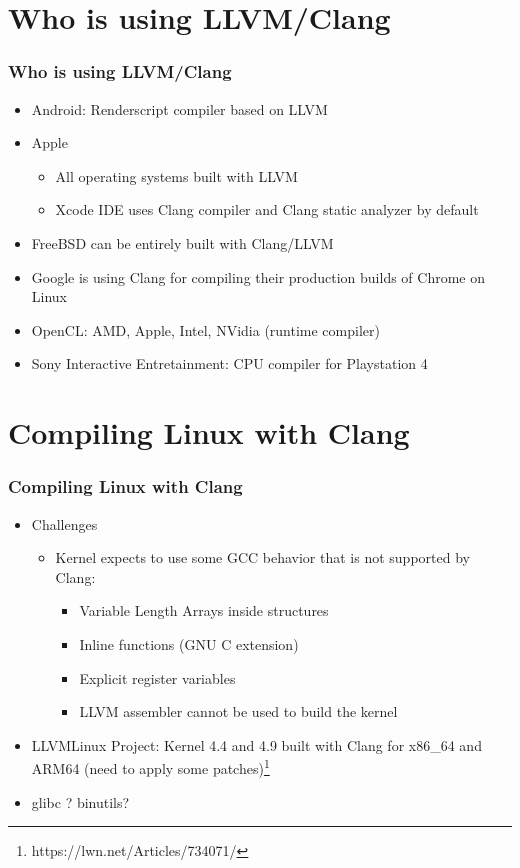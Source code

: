 \documentclass{beamer}
\begin{document}
\section{Who is using LLVM/Clang}

\begin{frame}
\frametitle{Who is using LLVM/Clang}
\begin{itemize}
  \item Android: Renderscript compiler based on LLVM
  \item Apple
  \begin{itemize}
    \item All operating systems built with LLVM
    \item Xcode IDE uses Clang compiler and Clang static analyzer by default
  \end{itemize}
  \item FreeBSD can be entirely built with Clang/LLVM
  \item Google is using Clang for compiling their production builds of Chrome on Linux
  \item OpenCL: AMD, Apple, Intel, NVidia (runtime compiler)
  \item Sony Interactive Entretainment: CPU compiler for Playstation 4
\end{itemize}
\end{frame}
\section{Compiling Linux with Clang}

\begin{frame}
\frametitle{Compiling Linux with Clang}
\begin{itemize}
  \item Challenges
  \begin{itemize}
    \item Kernel expects to use some GCC behavior that is not supported by Clang:
    \begin{itemize}
      \item Variable Length Arrays inside structures
      \item Inline functions (GNU C extension)
      \item Explicit register variables
      \item LLVM assembler cannot be used to build the kernel
    \end{itemize}
  \end{itemize}
  \item LLVMLinux Project: Kernel 4.4 and 4.9 built with Clang for x86\_64 and ARM64 (need to apply some patches)\footnote{https://lwn.net/Articles/734071/}
  \item glibc ? binutils?
\end{itemize}
\end{frame}
\end{document}
